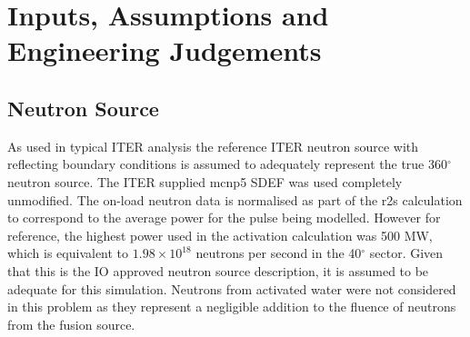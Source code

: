 \documentclass[12pt]{article}
\begin{document}
\clearpage
\newpage
\section{Inputs, Assumptions and Engineering Judgements}

\subsection{Neutron Source}
As used in typical ITER analysis the reference ITER neutron source 
\cite{iter_n_src} with
reflecting boundary conditions is assumed to adequately represent the
true 360$^{\circ}$ neutron source. The ITER supplied \gls{mcnp5} SDEF was used
completely unmodified. The on-load neutron data is normalised as part of the 
\gls{r2s} calculation to correspond to the 
average power for the pulse being modelled. However for reference,
the highest power used in the activation calculation was 500 MW, which is
equivalent to $1.98 \times 10^{18}$ neutrons per second in the 40$^{\circ}$
sector. Given that this is the IO approved neutron source description, it is
assumed to be adequate for this simulation.  Neutrons from activated water
were not considered in this problem as they represent a negligible addition
to the fluence of neutrons from the fusion source.
\end{document}

